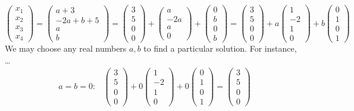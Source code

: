 \documentclass[12pt,letterpaper]{exam}
\begin{document}
\begin{questions}
{\[	\begin{pmatrix} x_1 \\ x_2 \\ x_3 \\ x_4 \end{pmatrix}= \begin{pmatrix} a + 3 \\ -2a + b + 5 \\ a \\ b \end{pmatrix}= \begin{pmatrix} 3 \\ 5 \\ 0 \\ 0 \end{pmatrix} + \begin{pmatrix} a \\ -2a \\ a \\ 0 \end{pmatrix} + \begin{pmatrix} 0 \\ b \\ 0 \\ b \end{pmatrix}= \boxed{\begin{pmatrix} 3 \\ 5 \\ 0 \\ 0 \end{pmatrix} + a \begin{pmatrix} 1 \\ -2 \\ 1 \\ 0 \end{pmatrix} + b \begin{pmatrix} 0 \\ 1 \\ 0 \\ 1 \end{pmatrix}}
	\]
We may choose any real numbers $a, b$ to find a particular solution. For instance, \dots
	\[
	\begin{aligned}
	a=b=0 \colon& \begin{pmatrix} 3 \\ 5 \\ 0 \\ 0 \end{pmatrix} + 0 \begin{pmatrix} 1 \\ -2 \\ 1 \\ 0 \end{pmatrix} + 0 \begin{pmatrix} 0 \\ 1 \\ 0 \\ 1 \end{pmatrix}= \begin{pmatrix} 3 \\ 5 \\ 0 \\ 0 \end{pmatrix} \\[0.2cm]

\end{aligned}\]}
\end{questions}
\end{document}
